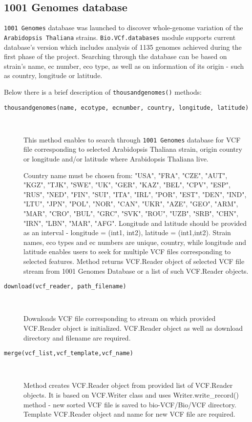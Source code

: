 \subsection{1001 Genomes database}
\label{sec:object}


\verb|1001 Genomes| database was launched to discover whole-genome variation of the \verb|Arabidopsis Thaliana| strains.
\verb|Bio.VCf.databases| module supports current database's version which includes analysis of 1135 genomes achieved
during the first phase of the project.
Searching through the database can be based on strain's name, ec number, eco type, as well as on information of its
origin - such as country, longitude or latitude.


\noindent Below there is a brief description of \verb|thousandgenomes()| methods:


\begin{description}
  \item[\texttt{thousandgenomes(name, ecotype, ecnumber, country, longitude, latitude)}] \

    This method enables to search through \verb|1001 Genomes| database for VCF file corresponding to selected
    Arabidopsis Thaliana strain, origin country or longitude and/or latitude where Arabidopsis Thaliana live.

    Country name must be chosen from: "USA", "FRA", "CZE", "AUT", "KGZ", "TJK", "SWE", "UK", "GER", "KAZ",
    "BEL", "CPV", "ESP", "RUS", "NED", "FIN", "SUI", "ITA", "IRL", "POR", "EST", "DEN", "IND", "LTU", "JPN", "POL", "NOR",
    "CAN", "UKR", "AZE", "GEO", "ARM", "MAR", "CRO", "BUL", "GRC", "SVK", "ROU", "UZB", "SRB", "CHN", "IRN", "LBN", "MAR",
    "AFG".
    Longitude and latitude should be provided as an interval - longitude = (int1, int2), latitude = (int1,int2).
    Strain names, eco types and ec numbers are unique, country, while longitude and latitude enables users to seek for
    multiple VCF files corresponding to selected features.
    Method returns VCF.Reader object of selected VCF file stream from 1001 Genomes Database or a list of
    such VCF.Reader objects.

\item[\texttt{download(vcf\_reader, path\_filename)}] \

    Downloads VCF file corresponding to stream on which provided VCF.Reader object is initialized.
    VCF.Reader object as well as download directory and filename are required.

\item[\texttt{merge(vcf\_list,vcf\_template,vcf\_name)}] \

    Method creates VCF.Reader object from provided list of VCF.Reader objects.
    It is based on VCF.Writer class and uses Writer.write\_record() method - new sorted VCF file is saved to
    bio-VCF/Bio/VCF directory.
    Template VCF.Reader object and name for new VCF file are required.

\end{description}

